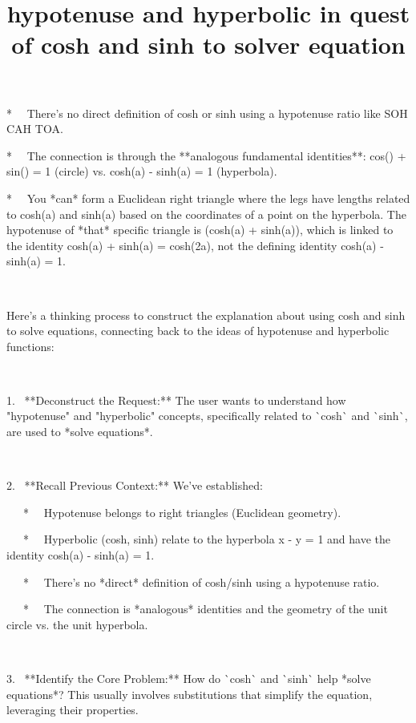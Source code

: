 \documentclass{article}
\newcommand{\nonconverted}[1]{\mbox{}}
\begin{document}
* \ \ There's no direct definition of cosh or sinh using a hypotenuse ratio
like SOH CAH TOA.

* \ \ The connection is through the **analogous fundamental identities**:
cos{\texttwosuperior}({\theta}) + sin{\texttwosuperior}({\theta}) = 1 (circle)
vs. cosh{\texttwosuperior}(a) - sinh{\texttwosuperior}(a) = 1 (hyperbola).

* \ \ You *can* form a Euclidean right triangle where the legs have lengths
related to cosh(a) and sinh(a) based on the coordinates of a point on the
hyperbola. The hypotenuse of *that* specific triangle is  \nonconverted{sqrt}
(cosh{\texttwosuperior}(a) + sinh{\texttwosuperior}(a)), which is linked to
the identity cosh{\texttwosuperior}(a) + sinh{\texttwosuperior}(a) = cosh(2a),
not the defining identity cosh{\texttwosuperior}(a) -
sinh{\texttwosuperior}(a) = 1.

\

\title{hypotenuse and hyperbolic in quest of cosh and sinh to solver
equation}

\maketitle

Here's a thinking process to construct the explanation about using cosh and
sinh to solve equations, connecting back to the ideas of hypotenuse and
hyperbolic functions:

\

1. \ **Deconstruct the Request:** The user wants to understand how
"hypotenuse" and "hyperbolic" concepts, specifically related to \`{}cosh\`{}
and \`{}sinh\`{}, are used to *solve equations*.

\

2. \ **Recall Previous Context:** We've established:

\ \ \ * \ \ Hypotenuse belongs to right triangles (Euclidean geometry).

\ \ \ * \ \ Hyperbolic (cosh, sinh) relate to the hyperbola
x{\texttwosuperior} - y{\texttwosuperior} = 1 and have the identity
cosh{\texttwosuperior}(a) - sinh{\texttwosuperior}(a) = 1.

\ \ \ * \ \ There's no *direct* definition of cosh/sinh using a hypotenuse
ratio.

\ \ \ * \ \ The connection is *analogous* identities and the geometry of the
unit circle vs. the unit hyperbola.

\

3. \ **Identify the Core Problem:** How do \`{}cosh\`{} and \`{}sinh\`{} help
*solve equations*? This usually involves substitutions that simplify the
equation, leveraging their properties.
\end{document}
